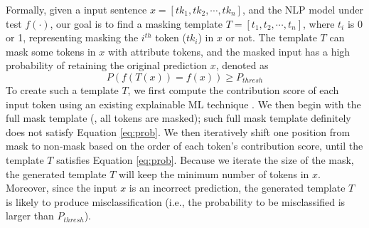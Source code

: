 Formally, given a input sentence $x = [tk_1, tk_2, \cdots, tk_n]$, and the NLP model under test $f(\cdot)$, our goal is to find a masking template $T = [t_1, t_2, \cdots, t_n]$, where $t_i$ is 0 or 1, representing masking the $i^{th}$ token (\ie $tk_i$) in $x$ or not.
The template $T$ can mask some tokens in $x$ with attribute tokens, and the masked input has a high probability of retaining the original prediction $x$, denoted as
\begin{equation}
    P(f(T(x)) = f(x)) \ge P_{thresh}
    \label{eq:prob}
\end{equation}
To create such a template $T$, we first compute the contribution score of each input token using an existing explainable ML technique \cite{lemna}. We then begin with the full mask template (\ie, all tokens are masked); such full mask template definitely does not satisfy Equation \ref{eq:prob}.
We then iteratively shift one position from mask to non-mask based on the order of each token's contribution score, until the template $T$ satisfies Equation \ref{eq:prob}.
Because we iterate the size of the mask, the generated template $T$ will keep the minimum number of tokens in $x$. Moreover, since the input $x$ is an incorrect prediction, the generated template $T$ is likely to produce misclassification (i.e., the probability to be misclassified is larger than $P_{thresh}$).



% 











%








